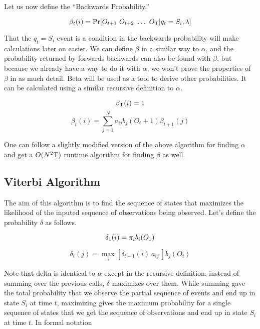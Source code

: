 Let us now define the ``Backwards Probability.''

\begin{equation}
  \beta_t(i) = \Pr[O_{t+1}\ O_{t+2}\ \ldots\ O_\Tau \vert q_t = S_i,
  \lambda]
\end{equation}

That the $q_t = S_i$ event is a condition in the backwards probability
will make calculations later on easier. We can define $\beta$ in a
similar way to $\alpha$, and the probability returned by forwards
backwards can also be found with $\beta$, but because we already have a way
to do it with $\alpha$, we won't prove the properties of $\beta$ in as
much detail. Beta will be used as a tool to derive other probabilities.
It can be calculated using a similar recursive definition to $\alpha$.

\begin{equation}
  \beta_{\mathrm{T}}(i) = 1\\
\end{equation}
\begin{equation}
  \beta_t(i) = \sum_{j=1}^N a_{ij} b_j(O_t+1) \beta_{t+1}(j)
\end{equation}

One can follow a slightly modified version of the above algorithm for
finding $\alpha$ and get a $O(N^2\mathrm{T})$ runtime algorithm for finding
$\beta$ as well.

\subsection{Viterbi Algorithm}

The aim of this algorithm is to find the sequence of states that
maximizes the likelihood of the inputed sequence of observations being
observed. Let's define the probability $\delta$ as follows.

\begin{equation}
  \delta_1(i) = \pi_i b_i(O_1)\\
\end{equation}

\begin{equation}
  \delta_t(j) = \max_i[\delta_{t-1}(i)\ a_{ij}\ ] b_j(O_t)
\end{equation}

Note that delta is identical to $\alpha$ except in the recursive
definition, instead of summing over the previous calls, $\delta$ maximizes
over them. While summing gave the total probability that we observe the
partial sequence of events and end up in state $S_i$ at time $t$,
maximizing gives the maximum probability for a single sequence of
states that we get the sequence of observations and end up in state
$S_i$ at time $t$. In formal notation

